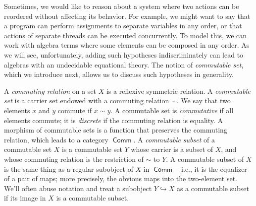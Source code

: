 \documentclass[a4paper,UKenglish,cleveref, autoref, thm-restate]{lipics-v2021}
\DeclareMathOperator{\Comm}{\mathsf{Comm}}
\begin{document}
Sometimes, we would like to reason about a system where two actions can be
reordered without affecting its behavior.  For example, we might want to say
that a program can perform assignments to separate variables in any order, or
that actions of separate threads can be executed concurrently.  To model this,
we can work with algebra terms where some elements can be composed in any order.
As we will see, unfortunately, adding such hypotheses indiscriminately can lead
to algebras with an undecidable equational theory.  The notion of
\emph{commutable set}, which we introduce next, allows us to discuss such
hypotheses in generality.

\begin{definition}
  \label{def:comm}
  A \emph{commuting relation} on a set $X$ is a reflexive symmetric relation.  A
  \emph{commutable set} is a carrier set endowed with a commuting relation
  $ \sim $.  We say that two elements $x$ and $y$ commute if $x \sim y$.  A
  commutable set is \emph{commutative} if all elements commute; it is
  \emph{discrete} if the commuting relation is equality.  A morphism of
  commutable sets is a function that preserves the commuting relation, which
  leads to a category $\Comm$.  A \emph{commutable subset} of a commutable set
  $X$ is a commutable set $Y$ whose carrier is a subset of $X$, and whose
  commuting relation is the restriction of $\sim$ to $Y$. %
  \iffull{}%
    A commutable subset of $X$ is the same thing as a regular subobject of $X$
    in $\Comm$---i.e., it is the equalizer of a pair of maps; more precisely,
    the obvious maps into the two-element set.%
  \fi{}%
  We'll often abuse notation and treat a subobject $Y \hookrightarrow X$ as a
  commutable subset if its image in $X$ is a commutable subset.
\end{definition}
\end{document}
